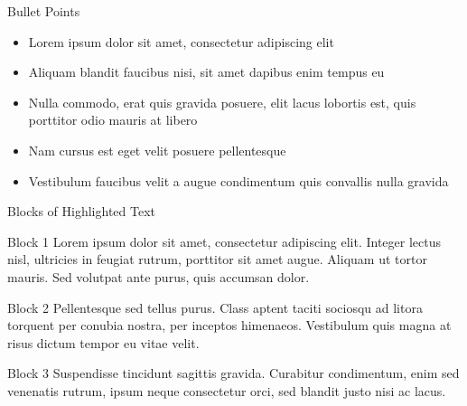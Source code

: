\documentclass{beamer}
\begin{document}

\begin{frame}{Bullet Points}
\begin{itemize}
\item Lorem ipsum dolor sit amet, consectetur adipiscing elit
\item Aliquam blandit faucibus nisi, sit amet dapibus enim tempus eu
\item Nulla commodo, erat quis gravida posuere, elit lacus lobortis est, quis porttitor odio mauris at libero
\item Nam cursus est eget velit posuere pellentesque
\item Vestibulum faucibus velit a augue condimentum quis convallis nulla gravida
\end{itemize}
\end{frame}


\begin{frame}{Blocks of Highlighted Text}
\begin{block}{Block 1}
Lorem ipsum dolor sit amet, consectetur adipiscing elit. Integer lectus nisl, ultricies in feugiat rutrum, porttitor sit amet augue. Aliquam ut tortor mauris. Sed volutpat ante purus, quis accumsan dolor.
\end{block}

\begin{block}{Block 2}
Pellentesque sed tellus purus. Class aptent taciti sociosqu ad litora torquent per conubia nostra, per inceptos himenaeos. Vestibulum quis magna at risus dictum tempor eu vitae velit.
\end{block}

\begin{block}{Block 3}
Suspendisse tincidunt sagittis gravida. Curabitur condimentum, enim sed venenatis rutrum, ipsum neque consectetur orci, sed blandit justo nisi ac lacus.
\end{block}
\end{frame}

\end{document}
